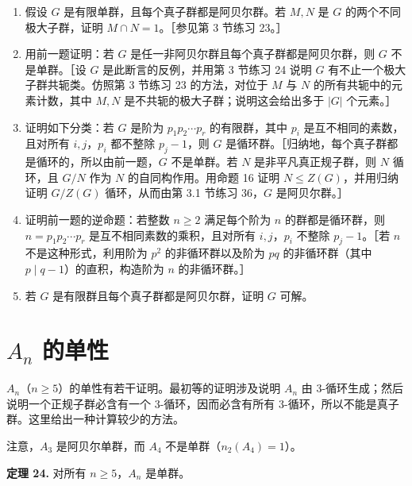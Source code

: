 \begin{enumerate}[label=\arabic*.,resume]
  \item 假设 $G$ 是有限单群，且每个真子群都是阿贝尔群。若 $M,N$ 是 $G$ 的两个不同极大子群，证明 $M\cap N=1$。［参见第 3 节练习 23。］
  \item 用前一题证明：若 $G$ 是任一非阿贝尔群且每个真子群都是阿贝尔群，则 $G$ 不是单群。［设 $G$ 是此断言的反例，并用第 3 节练习 24 说明 $G$ 有不止一个极大子群共轭类。仿照第 3 节练习 23 的方法，对位于 $M$ 与 $N$ 的所有共轭中的元素计数，其中 $M,N$ 是不共轭的极大子群；说明这会给出多于 $|G|$ 个元素。］
  \item 证明如下分类：若 $G$ 是阶为 $p_1p_2\cdots p_r$ 的有限群，其中 $p_i$ 是互不相同的素数，且对所有 $i,j$，$p_i$ 都不整除 $p_j-1$，则 $G$ 是循环群。［归纳地，每个真子群都是循环的，所以由前一题，$G$ 不是单群。若 $N$ 是非平凡真正规子群，则 $N$ 循环，且 $G/N$ 作为 $N$ 的自同构作用。用命题 16 证明 $N\leq Z(G)$，并用归纳证明 $G/Z(G)$ 循环，从而由第 3.1 节练习 36，$G$ 是阿贝尔群。］
  \item 证明前一题的逆命题：若整数 $n\geq2$ 满足每个阶为 $n$ 的群都是循环群，则 $n=p_1p_2\cdots p_r$ 是互不相同素数的乘积，且对所有 $i,j$，$p_i$ 不整除 $p_j-1$。［若 $n$ 不是这种形式，利用阶为 $p^2$ 的非循环群以及阶为 $pq$ 的非循环群（其中 $p\mid q-1$）的直积，构造阶为 $n$ 的非循环群。］
  \item 若 $G$ 是有限群且每个真子群都是阿贝尔群，证明 $G$ 可解。
\end{enumerate}

\section{$A_n$ 的单性}

$A_n$（$n\geq5$）的单性有若干证明。最初等的证明涉及说明 $A_n$ 由 $3$-循环生成；然后说明一个正规子群必含有一个 $3$-循环，因而必含有所有 $3$-循环，所以不能是真子群。这里给出一种计算较少的方法。

注意，$A_3$ 是阿贝尔单群，而 $A_4$ 不是单群（$n_2(A_4)=1$）。

\medskip
\noindent\textbf{定理 24.} 对所有 $n\geq5$，$A_n$ 是单群。

